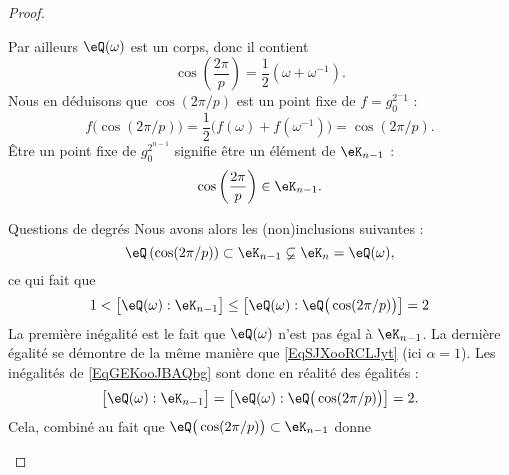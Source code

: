 \begin{proof}
\begin{subproof}
\begin{subproof}
                        Par ailleurs \( \eQ(\omega)\) est un corps, donc il contient 
                        \begin{equation}
                            \cos\left( \frac{ 2\pi }{ p } \right)=\frac{ 1 }{2}(\omega+\omega^{-1}).
                        \end{equation}
                        Nous en déduisons que \( \cos(2\pi/p)\) est un point fixe de \( f=g_0^{2^-1}\) :
                        \begin{equation}
                            f\big( \cos(2\pi/p) \big)=\frac{ 1 }{2}\big( f(\omega)+f(\omega^{-1}) \big)=\cos(2\pi/p).
                        \end{equation}
                        Être un point fixe de \( g_0^{2^{n-1}}\) signifie être un élément de \( \eK_{n-1}\) :
                        \begin{equation}
                            \cos\left( \frac{ 2\pi }{ p } \right)\in \eK_{n-1}.
                        \end{equation}
                    \item[Questions de degrés]
                        Nous avons alors les (non)inclusions suivantes :
                        \begin{equation}
                            \eQ\left( \cos(2\pi/p) \right)\subset \eK_{n-1}\varsubsetneq \eK_n=\eQ(\omega),
                        \end{equation}
                        ce qui fait que
                        \begin{equation}    \label{EqGEKooJBAQbg}
                            1<\big[ \eQ(\omega):\eK_{n-1} \big]\leq\big[ \eQ(\omega):\eQ\big( \cos(2\pi/p) \big) \big]=2
                        \end{equation}
                        La première inégalité est le fait que \( \eQ(\omega)\) n'est pas égal à \( \eK_{n-1}\). La dernière égalité se démontre de la même manière que \eqref{EqSJXooRCLJyt} (ici \( \alpha=1\)). Les inégalités de \eqref{EqGEKooJBAQbg} sont donc en réalité des égalités :
                        \begin{equation}
                            \big[ \eQ(\omega):\eK_{n-1} \big]=\big[ \eQ(\omega):\eQ\big( \cos(2\pi/p) \big) \big]=2.
                        \end{equation}
                        Cela, combiné au fait que \( \eQ\big( \cos(2\pi/p) \big)\subset \eK_{n-1}\) donne
                        \begin{equation}

\end{equation}
\end{subproof}
\end{subproof}
\end{proof}
